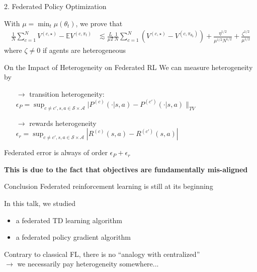 \documentclass[12pt,aspectratio=169]{beamer}
\begin{document}
\begin{frame}{2. Federated Policy Optimization}
  
  With $\mu = \min_t \mu(\theta_t)$, we prove that
  \begin{align*}
    \frac{1}{N} \sum_{c=1}^N V^{(c,\star)} - \mathbb{E} V^{(c,\pi_t)}
    & \lesssim
      \frac{ L }{\mu T} \frac{1}{N} \sum_{c=1}^N( V^{(c,\star)} -  V^{(c,\pi_{\theta_0})} )
      + \frac{\eta^{1/2}}{\mu^{1/2} N^{1/2}}
      + \frac{\zeta^{1/2}}{\mu^{1/2}}
  \end{align*}
  where $\zeta \neq 0$ if agents are heterogeneous
\end{frame}

\begin{frame}{On the Impact of Heterogeneity on Federated RL}
  We can measure heterogeneity by
  \begin{itemize}
  \item[$\rightarrow$] transition heterogeneity:
    $\epsilon_P = \sup_{c\neq c', s, a \in \mathcal{S} \times \mathcal{A}} \lvert P^{(c)}(\cdot  | s, a) - P^{(c')}(\cdot | s, a) \rVert_{TV}$
    
  \item[$\rightarrow$] rewards heterogeneity
    $\epsilon_r = \sup_{c\neq c', s, a \in \mathcal{S} \times \mathcal{A}} | R^{(c)}(s, a) - R^{(c')}(s, a) |$
  \end{itemize}

  Federated error is always of order $\epsilon_P + \epsilon_r$

  \textbf{\textcolor{amaranth}{This is due to the fact that objectives are fundamentally mis-aligned}}

  

\end{frame}

\begin{frame}{Conclusion}
  \large 
  Federated reinforcement learning is still at its beginning

  In this talk, we studied
  \begin{itemize}
  \item a federated TD learning algorithm
  \item a federated policy gradient algorithm
  \end{itemize}

  Contrary to classical FL, there is no ``analogy with centralized'' \\
  $\rightarrow$ we necessarily pay heterogeneity somewhere...

\end{frame}
\end{document}
